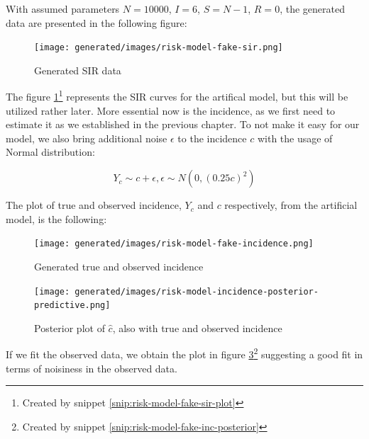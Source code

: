 \documentclass[
  digital, %
  oneside, %
  lof,     %
  lot,     %
]{fithesis4}
\begin{document}
With assumed parameters $N = 10000$, $I = 6$, $S = N - 1$, $R = 0$, the generated data are presented in the following figure:

\begin{figure}[H]
  \begin{center}
    \texttt{[image: generated/images/risk-model-fake-sir.png]}
  \end{center}
  \caption{Generated SIR data}
  \label{fig:risk-model-fake-sir}
\end{figure}

The figure \ref{fig:risk-model-fake-sir}\footnote{Created by snippet \ref{snip:risk-model-fake-sir-plot}} represents the SIR curves for the artifical model, but this will be utilized rather later.
More essential now is the incidence, as we first need to estimate it as we established in the previous chapter.
To not make it easy for our model, we also bring additional noise $\epsilon$ to the incidence $c$ with the usage of Normal distribution:

\begin{equation}
  Y_{c} \sim c + \epsilon, \epsilon \sim N \left( 0, \left( 0.25 c \right )^2 \right)
\end{equation}

The plot of true and observed incidence, $Y_{c}$ and $c$ respectively, from the artificial model, is the following:

\begin{figure}[H]
  \begin{center}
    \texttt{[image: generated/images/risk-model-fake-incidence.png]}
  \end{center}
  \caption{Generated true and observed incidence}
  \label{fig:risk-model-fake-incidence}
\end{figure}

\begin{figure}[H]
  \begin{center}
    \texttt{[image: generated/images/risk-model-incidence-posterior-predictive.png]}
  \end{center}
  \caption{Posterior plot of $\hat{c}$, also with true and observed incidence}
  \label{fig:risk-model-incidence-posterior-predictive}
\end{figure}

If we fit the observed data, we obtain the plot in figure \ref{fig:risk-model-incidence-posterior-predictive}\footnote{Created by snippet \ref{snip:risk-model-fake-inc-posterior}} suggesting a good fit in terms of noisiness in the observed data.
\end{document}

